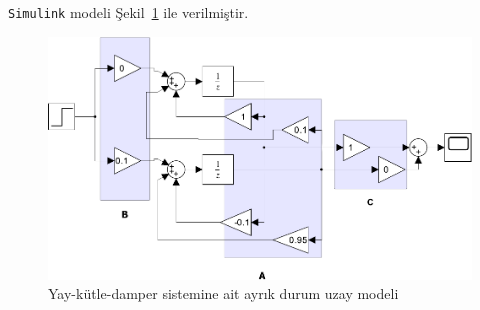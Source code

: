 \verb|Simulink| modeli Şekil~\ref{fig:model2} ile verilmiştir.
\begin{figure}[!htb]
    \centering
    \includegraphics[width=\textwidth]{img/model2}
    \caption{Yay-kütle-damper sistemine ait ayrık durum uzay modeli}
    \label{fig:model2}
\end{figure}
